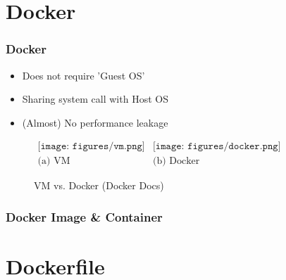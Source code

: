 \documentclass{beamer}
\begin{document}
    \section{Docker}
    \begin{frame}
        \frametitle{Docker}

        \begin{itemize}
            \item Does not require 'Guest OS'
            \item Sharing system call with Host OS
            \item (Almost) No performance leakage
        \end{itemize}

        \begin{figure}[h!]
            $\begin{array}{cc}
                \texttt{[image: figures/vm.png]}
                &
                \texttt{[image: figures/docker.png]}
                \\
                \mbox{(a) VM} & \mbox{(b) Docker}
            \end{array}$
            \caption{VM vs. Docker (Docker Docs)}
        \end{figure}
    \end{frame}

    \begin{frame}
        \frametitle{Docker Image \& Container}
    \end{frame}

    \section{Dockerfile}
\end{document}
